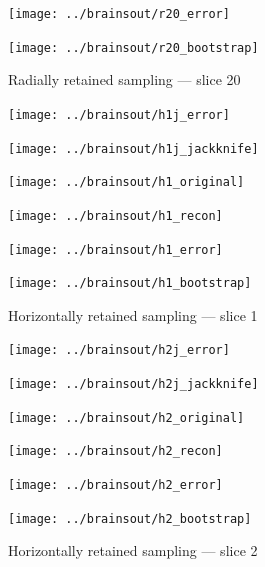 \documentclass[article]{jdssv}
\begin{document}
\begin{appendix}
\begin{figure}
\begin{centering}
\parbox{\imsize}{\texttt{[image: ../brainsout/r20\_error]}}
\parbox{\imsize}{\texttt{[image: ../brainsout/r20\_bootstrap]}}

\end{centering}
\caption{Radially retained sampling --- slice 20}
\end{figure}


\begin{figure}
\begin{centering}

\parbox{\imsize}{\texttt{[image: ../brainsout/h1j\_error]}}
\parbox{\imsize}{\texttt{[image: ../brainsout/h1j\_jackknife]}}

\vspace{\vertsep}

\parbox{\imsize}{\texttt{[image: ../brainsout/h1\_original]}}
\parbox{\imsize}{\texttt{[image: ../brainsout/h1\_recon]}}

\vspace{\vertsep}

\parbox{\imsize}{\texttt{[image: ../brainsout/h1\_error]}}
\parbox{\imsize}{\texttt{[image: ../brainsout/h1\_bootstrap]}}

\end{centering}
\caption{Horizontally retained sampling --- slice 1}
\end{figure}


\begin{figure}
\begin{centering}

\parbox{\imsize}{\texttt{[image: ../brainsout/h2j\_error]}}
\parbox{\imsize}{\texttt{[image: ../brainsout/h2j\_jackknife]}}

\vspace{\vertsep}

\parbox{\imsize}{\texttt{[image: ../brainsout/h2\_original]}}
\parbox{\imsize}{\texttt{[image: ../brainsout/h2\_recon]}}

\vspace{\vertsep}

\parbox{\imsize}{\texttt{[image: ../brainsout/h2\_error]}}
\parbox{\imsize}{\texttt{[image: ../brainsout/h2\_bootstrap]}}

\end{centering}
\caption{Horizontally retained sampling --- slice 2}
\end{figure}


\begin{figure}
\begin{centering}


\end{centering}
\end{figure}
\end{appendix}
\end{document}
